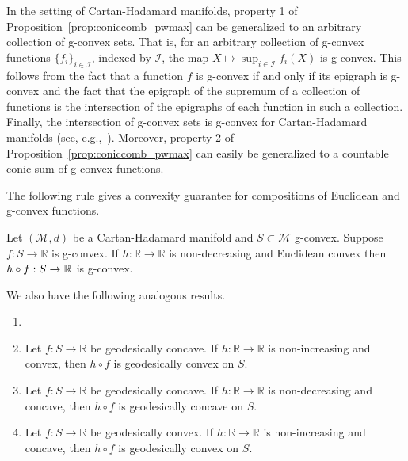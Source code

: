 \documentclass[twoside,11pt]{article}
\begin{document}
{
\begin{remark}
    In the setting of Cartan-Hadamard manifolds, property 1 of Proposition~\ref{prop:coniccomb_pwmax} can be generalized to an arbitrary collection of g-convex sets. That is, for an arbitrary collection of g-convex functions $\{f_i\}_{i \in\mathcal{I}}$, indexed by $\mathcal{I}$, the map $X \mapsto \sup_{i \in \mathcal{I}}f_i(X)$ is g-convex. This follows from the fact that a function $f$ is g-convex if and only if its epigraph is g-convex \citep{bacak2014convex} and the fact that the epigraph of the supremum of a collection of functions is the intersection of the epigraphs of each function in such a collection. Finally, the intersection of g-convex sets is g-convex for Cartan-Hadamard manifolds (see, e.g.,~\citep{boumal2020introduction}).
    Moreover, property 2 of Proposition~\ref{prop:coniccomb_pwmax} can easily be generalized to a countable conic sum of g-convex functions. 
\end{remark}
}

The following rule gives a convexity guarantee for compositions of Euclidean and g-convex functions. 
\begin{prop}\label{prop:ecvx_composition}
     Let $(\mathcal{M}, d)$ be a Cartan-Hadamard manifold and $S \subset \mathcal{M}$ g-convex. Suppose $f: S \rightarrow \mathbb{R}$ is g-convex. If $h: \mathbb{R} \rightarrow \mathbb{R}$ is non-decreasing and Euclidean convex then $h \circ f: S \to \mathbb{R}$ is g-convex.
\end{prop}

We also have the following analogous results.
\begin{corollary}
        \begin{enumerate}
            \item[]
           \item Let $f: S \rightarrow \mathbb{R}$ be geodesically concave. If $h: \mathbb{R} \rightarrow \mathbb{R}$ is non-increasing and convex, then $h \circ f$ is geodesically convex on $S$.
            \item Let $f: S \rightarrow \mathbb{R}$ be geodesically concave. If $h: \mathbb{R} \rightarrow \mathbb{R}$ is non-decreasing and concave, then $h \circ f$ is geodesically concave on $S$.
            \item Let $f: S \rightarrow \mathbb{R}$ be geodesically convex. If $h: \mathbb{R} \rightarrow \mathbb{R}$ is non-increasing and concave, then $h \circ f$ is geodesically convex on $S$.
        \end{enumerate}
    \end{corollary}
\end{document}
